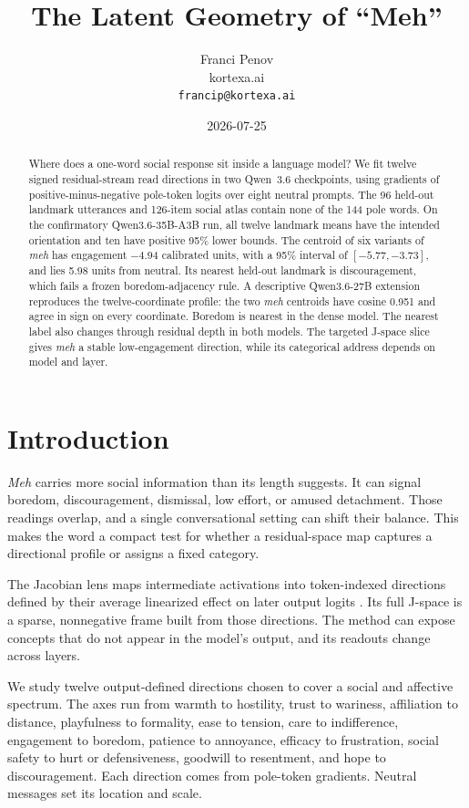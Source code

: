 \documentclass[10pt]{article}
\title{The Latent Geometry of ``Meh''}
\author{Franci Penov \\ kortexa.ai \\ \texttt{francip@kortexa.ai}}
\date{2026-07-25}
\newcommand{\moemodel}{Qwen3.6-35B-A3B}
\newcommand{\densemodel}{Qwen3.6-27B}
\begin{document}
\maketitle

\begin{abstract}
Where does a one-word social response sit inside a language model? We fit
twelve signed residual-stream read directions in two Qwen~3.6 checkpoints,
using gradients of positive-minus-negative pole-token logits over eight neutral
prompts. The 96 held-out landmark utterances and 126-item social atlas contain
none of the 144 pole words. On the confirmatory \moemodel{} run, all twelve
landmark means have the intended orientation and ten have positive 95\% lower
bounds. The centroid of six variants of \emph{meh} has engagement
$-4.94$ calibrated units, with a 95\% interval of $[-5.77,-3.73]$, and lies
5.98 units from neutral. Its nearest held-out landmark is discouragement,
which fails a frozen boredom-adjacency rule. A descriptive \densemodel{}
extension reproduces the twelve-coordinate profile: the two \emph{meh}
centroids have cosine 0.951 and agree in sign on every coordinate. Boredom is
nearest in the dense model. The nearest label also changes through residual
depth in both models. The targeted J-space slice gives \emph{meh} a
stable low-engagement direction, while its categorical address depends on
model and layer.
\end{abstract}

\section{Introduction}

\emph{Meh} carries more social information than its length suggests. It can
signal boredom, discouragement, dismissal, low effort, or amused detachment.
Those readings overlap, and a single conversational setting can shift their
balance. This makes the word a compact test for whether a residual-space map
captures a directional profile or assigns a fixed category.

The Jacobian lens maps intermediate activations into token-indexed directions
defined by their average linearized effect on later output logits
\cite{gurnee2026verbalizable}. Its full J-space is a sparse, nonnegative frame
built from those directions. The method can expose concepts that do not appear
in the model's output, and its readouts change across layers.

We study twelve output-defined directions chosen to cover a social and
affective spectrum. The axes run from warmth to hostility, trust to
wariness, affiliation to distance, playfulness to formality, ease to tension,
care to indifference, engagement to boredom, patience to annoyance, efficacy
to frustration, social safety to hurt or defensiveness, goodwill to resentment,
and hope to discouragement. Each direction comes from pole-token gradients.
Neutral messages set its location and scale.
\end{document}
